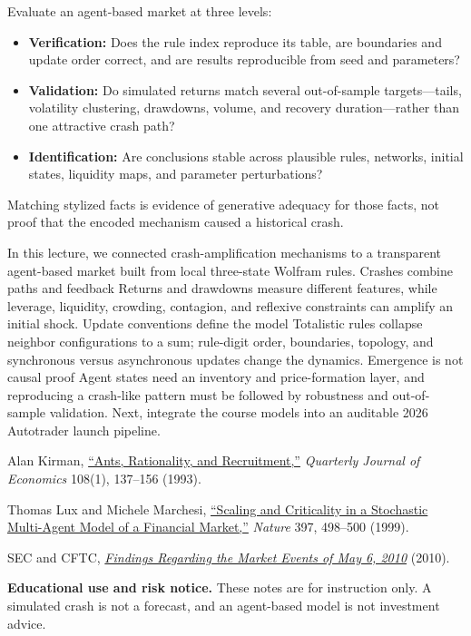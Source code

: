 \documentclass[11pt]{article}
\begin{document}
Evaluate an agent-based market at three levels:
\begin{itemize}[leftmargin=1.3em,itemsep=2pt,topsep=2pt]
  \item \textbf{Verification:} Does the rule index reproduce its table, are boundaries and update order correct, and are results reproducible from seed and parameters?
  \item \textbf{Validation:} Do simulated returns match several out-of-sample targets---tails, volatility clustering, drawdowns, volume, and recovery duration---rather than one attractive crash path?
  \item \textbf{Identification:} Are conclusions stable across plausible rules, networks, initial states, liquidity maps, and parameter perturbations?
\end{itemize}
Matching stylized facts is evidence of generative adequacy for those facts, not proof that the encoded mechanism caused a historical crash.

\keytakeaways
  {In this lecture, we connected crash-amplification mechanisms to a transparent agent-based market built from local three-state Wolfram rules.}
  {Crashes combine paths and feedback}
  {Returns and drawdowns measure different features, while leverage, liquidity, crowding, contagion, and reflexive constraints can amplify an initial shock.}
  {Update conventions define the model}
  {Totalistic rules collapse neighbor configurations to a sum; rule-digit order, boundaries, topology, and synchronous versus asynchronous updates change the dynamics.}
  {Emergence is not causal proof}
  {Agent states need an inventory and price-formation layer, and reproducing a crash-like pattern must be followed by robustness and out-of-sample validation.}
  {Next, integrate the course models into an auditable 2026 Autotrader launch pipeline.}

\begin{readinglist}
  \item Alan Kirman, \href{https://doi.org/10.2307/2233844}{``Ants, Rationality, and Recruitment,''} \emph{Quarterly Journal of Economics} 108(1), 137--156 (1993).
  \item Thomas Lux and Michele Marchesi, \href{https://doi.org/10.1038/17290}{``Scaling and Criticality in a Stochastic Multi-Agent Model of a Financial Market,''} \emph{Nature} 397, 498--500 (1999).
  \item SEC and CFTC, \href{https://www.sec.gov/files/marketevents-report.pdf}{\emph{Findings Regarding the Market Events of May 6, 2010}} (2010).
\end{readinglist}

{\sffamily\footnotesize\color{vnmuted}\textbf{Educational use and risk notice.} These notes are for instruction only. A simulated crash is not a forecast, and an agent-based model is not investment advice.}
\end{document}
